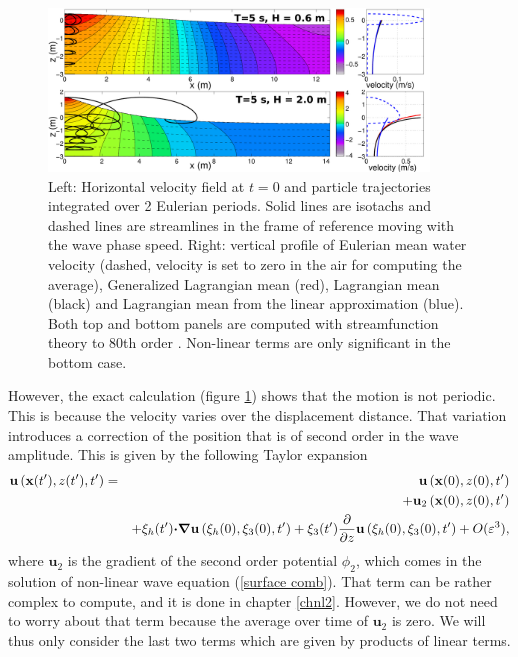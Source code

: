 \begin{figure}[htb]
\centerline{\includegraphics[width=0.9\textwidth]{FIGS_CH_MOMENTUM/Drift_lin_nonlin.pdf}}
  \caption{Left: Horizontal velocity field at $t=0$ and particle trajectories integrated over 2 Eulerian periods. 
Solid lines are isotachs and dashed lines are streamlines in the frame of reference moving with the wave phase speed. Right: vertical profile of Eulerian mean water velocity (dashed, velocity 
is set to zero in the air for computing the average), Generalized Lagrangian mean (red), Lagrangian mean (black) and Lagrangian mean from the linear 
approximation (blue). Both top and bottom panels are computed with streamfunction theory to 80th order \citep{Dalrymple1974}. Non-linear terms are only significant in the bottom case.}
\label{fig:drift_stream}
\end{figure}
However, the exact calculation (figure \ref{fig:drift_stream}) shows that the motion is not periodic. This is because the velocity varies over the displacement 
distance. That variation introduces a correction of the position that is of second order 
in the wave amplitude. This is given by the following Taylor expansion 
\begin{eqnarray}
    \mathbf{u}\left({\mathbf x}(t^\prime),z(t^\prime),t^\prime\right) & =&
    \mathbf{u}\left({\mathbf x}(0),z(0),t^\prime\right) \nonumber\\
   && +  \mathbf{u}_2\left({\mathbf x}(0),z(0),t^\prime\right)  \nonumber\\
    &&+ \xi_h(t')\mbox{\boldmath $\cdot$} \mbox{\boldmath $\nabla$} \mathbf{u}\left(\xi_h(0),\xi_3(0),t^\prime\right)
    +\xi_3(t') \frac{\partial}{\partial z} \mathbf{u}\left(\xi_h(0),\xi_3(0),t^\prime\right)
    + O(\varepsilon^3),\label{eq:Stokes_drift_Taylor}
    \end{eqnarray}
where $\mathbf{u}_2$  is the gradient of the second order potential $\phi_2$,
    which comes in the solution of non-linear wave equation (\ref{surface comb}). That term can be rather complex to compute, and it is 
done in chapter \ref{chnl2}. However, we do not need to worry about that term because the average over time of $\mathbf{u}_2$  is zero. 
We will thus only consider the last two terms which are given by products of linear terms. 

